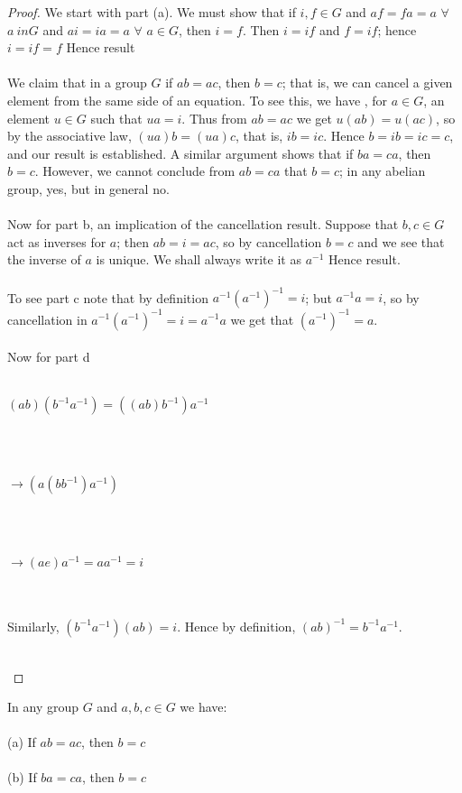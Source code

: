 \documentclass[12pt]{article}
\newenvironment{lemma}[2][Lemma]{\begin{trivlist}
\item[\hskip \labelsep {\bfseries #1}\hskip \labelsep {\bfseries #2.}]}{\end{trivlist}}
\begin{document}
\begin{proof}
We start with part (a). We must show that if $i,f \in G$ and $af = fa = a$ $\forall$ $a \ in G$ and $ai = ia = a$ $\forall$ $a \in G$, then $i =f$. Then $i=if$ and $f=if$; hence $i=if=f$ Hence result \\ \\
We claim that in a group $G$ if $ab = ac$, then $b=c$; that is, we can cancel a given element from the same side of an equation. To see this, we have , for $a \in G$, an element $u \in G$ such that $ua = i$. Thus from $ab = ac$ we get $u(ab) = u(ac)$, so by the associative law, $(ua)b = (ua)c$, that is, $ib = ic$. Hence $b=ib=ic=c$, and our result is established. A similar argument shows that if  $ba = ca$, then $b=c$. However, we cannot conclude from $ab = ca$ that $b=c$; in any abelian group, yes, but in general no. \\ \\
Now for part b, an implication of the cancellation result. Suppose that $b,c \in G$ act as inverses for $a$; then $ab = i =ac$, so by cancellation $b=c$ and we see that the inverse of $a$ is unique. We shall always write it as $a^{-1}$ Hence result. \\ \\
To see part c note that by definition $a^{-1}(a^{-1})^{-1} = i$; but $a^{-1}a=i$, so by cancellation in $a^{-1}(a^{-1})^{-1} = i = a^{-1}a$ we get that $(a^{-1})^{-1} =a$. \\ \\
Now for part d \\ \\
\centerline{$(ab)(b^{-1}a^{-1}) = ((ab)b^{-1})a^{-1}$} \\ \\
\centerline{$ \rightarrow (a(bb^{-1})a^{-1})$} \\ \\
\centerline{$ \rightarrow (ae)a^{-1} = aa^{-1} = i$} \\ \\
Similarly, $(b^{-1}a^{-1})(ab) = i$. Hence by definition, $(ab)^{-1}=b^{-1}a^{-1}$. \\ \\
\centerline{}
\end{proof}
 
 \begin{lemma}{2.2.2}
In any group $G$ and $a,b,c \in G$ we have: \\ \\
(a) If $ab = ac$, then $b=c$ \\ \\
(b) If $ba = ca$, then $b=c$
\end{lemma}
\end{document}
